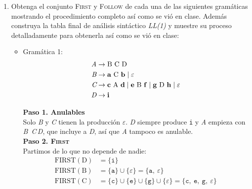 \documentclass[12pt,letterpaper]{article}
\newcommand{\nt}[1]{\textit{#1}}
\newcommand{\tk}[1]{\texttt{#1}}
\newcommand{\tx}[1]{\text{#1}}
\newcommand{\First}[1]{\mathrm{FIRST}(#1)}
\newcommand{\eps}{\varepsilon}
\begin{document}
\thispagestyle{empty}


\newpage

\begin{enumerate}[label=\arabic*.]

\item Obtenga el conjunto \textsc{First} y \textsc{Follow} de cada una de las siguientes gramáticas mostrando el
  procedimiento completo así como se vió en clase. Además construya la tabla final de análisis sintáctico
  \nt{LL(1)} y muestre su proceso detalladamente para obtenerla así como se vió en clase:
  
  \begin{itemize}
  \item Gramática 1:
    \[
    \begin{aligned}
      \nt{A} &\to \tx{B}\ \tx{C}\ \tx{D}\\
      \nt{B} &\to \bf{a}\ \tx{C}\ \bf{b} \mid \eps \\
      \nt{C} &\to \bf{c}\ \tx{A}\ \bf{d} \mid \bf{e}\ \tx{B}\ \bf{f} \mid \bf{g}\ \tx{D}\ \bf{h} \mid \eps \\
      \nt{D} &\to \bf{i}
    \end{aligned}
    \]

    \bigskip
    
    \textbf{Paso 1. Anulables}\\
    Solo \nt{B} y \nt{C} tienen la producción $\eps$. \nt{D} siempre produce \tk{i} y \nt{A} empieza con \nt{B}\,
    \nt{C}\,\nt{D}, que incluye a \nt{D}, así que \nt{A} tampoco es anulable.\\

    \textbf{Paso 2. \textsc{First}}\\
    Partimos de lo que no depende de nadie:
    \[
    \begin{aligned}
      \First{\tx{D}} &= \{\tk{i}\} \\
      \First{\tx{B}} &= \{\tk{a}\} \cup \{\eps\} = \{\tk{a},\ \eps\} \\
      \First{\tx{C}} &= \{\tk{c}\} \cup \{\tk{e}\} \cup \{\tk{g}\} \cup \{\eps\} = \{\tk{c},\ \tk{e},\ \tk{g},\
      \eps\}
    \end{aligned}
    \]
    

\end{itemize}
\end{enumerate}
\end{document}
